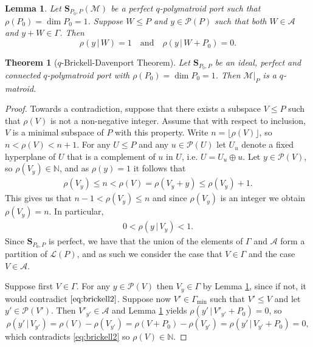 \documentclass[10pt,a4paper]{amsart}
\newtheorem{lemma}{Lemma}
\newtheorem{theorem}{Theorem}
\newcommand{\A}{\mathcal{A}}
\renewcommand{\L}{\mathcal{L}}
\newcommand{\M}{\mathcal{M}}
\renewcommand{\P}{\mathcal{P}}
\renewcommand{\S}{\mathbf{S}}
\begin{document}
\begin{lemma}
Let $\S_{P_0,P}(\mathcal{M})$ be a perfect $q$-polymatroid port such that $\rho(P_0) = \dim P_0 =1$. Suppose $W\leq P$ and $y\in \P(P)$ such that both $W\in \A$ and $y+W\in \Gamma$. Then \label{lem:brickell2}
$$
    \rho(y\,|\, W) = 1 \quad \text{and} \quad \rho(y\,|\, W+P_0)=0.
$$
\end{lemma}

\begin{theorem}[$q$-Brickell-Davenport Theorem] Let $\S_{P_0,P}$ be an ideal, perfect and connected $q$-polymatroid port with $\rho(P_0) = \dim P_0 = 1$. Then $\M|_P$ is a $q$-matroid. \label{thm:brickelldavenport}
\end{theorem}

\begin{proof}
Towards a contradiction, suppose that there exists a subspace $V\leq P$ such that $\rho(V)$ is not a non-negative integer. Assume that with respect to inclusion, $V$ is a minimal subspace of $P$ with this property. Write $n= \lfloor \rho(V) \rfloor$, so $n < \rho(V) <n+1.$ For any $U\leq P$ and any $u\in \P(U)$ let $U_u$ denote a fixed hyperplane of $U$ that is a complement of $u$ in $U$, i.e. $U = U_u \oplus u$. Let $y\in \P(V)$, so $\rho(V_y)\in \mathbb{N}$, and as $\rho(y) = 1$ it follows that
\begin{align}
    \rho(V_y) \leq n <\rho(V) = \rho(V_y + y) \leq \rho(V_y) +1.\label{eq:brickell1}
\end{align}
This gives us that $n-1 <\rho(V_y) \leq n$ and since $\rho(V_y)$ is an integer we obtain $\rho(V_y) = n$. In particular,
\begin{align}
    0<\rho(y\,|\, V_y) <1. \label{eq:brickell2}
\end{align}
%
Since $\S_{P_0,P}$ is perfect, we have that the union of the elements of $\Gamma$ and $\A$ form a partition of $\L(P)$, and as such we consider the case that $V \in \Gamma$ and the case $V \in \A$.

Suppose first $V\in \Gamma$. For any $y\in \P(V)$ then $V_y\in \Gamma$ by Lemma \ref{lem:brickell2}, since if not, it would contradict $\eqref{eq:brickell2}$. Suppose now $V'\in \Gamma_{\min}$ such that $V'\leq V$ and let $y'\in \P(V')$. Then $V'_{y'}\in \A$ and Lemma \ref{lem:brickell2} yields $\rho(y'\,|\, V'_{y'}+P_0) = 0$, so
\[
    \rho(y'\,|\, V_{y'}) = \rho(V) - \rho(V_{y'}) = \rho(V+P_0) - \rho(V_{y'}) = \rho(y'\,|\, V_{y'}+P_0)=0,
\]
which contradicts \eqref{eq:brickell2} so $\rho(V)\in \mathbb{N}$.


\end{proof}
\end{document}
